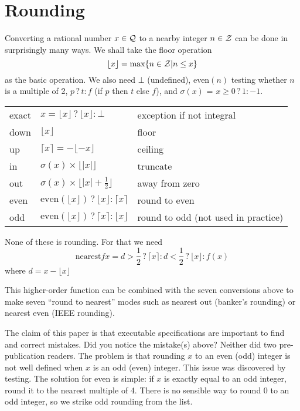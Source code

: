 \documentclass{article}
\begin{document}
\def\subI{${}_I$}
\def\subF{${}_F$}
\def\subD{${}_D$}
\def\ifso{\mathbin{?}}

\section{Rounding}

Converting a rational number $x \in {\cal Q}$ to a nearby
integer $n \in {\cal Z}$ can be done in surprisingly many
ways.  We shall take the floor operation
\[ \lfloor x \rfloor = \max \{n \in {\cal Z} | n \le x\} \]
as the basic operation.  We also need $\bot$ (undefined),
even$(n)$ testing whether $n$ is a multiple of 2,
$p \ifso t : f$ (if $p$ then $t$ else $f$), and $\sigma(x)$ =
$x\ge 0 \ifso 1 : -1$.

\begin{tabular}{lll}
exact & $x=\lfloor x\rfloor \ifso \lfloor x \rfloor : \bot$ &
        exception if not integral\\
down  & $\lfloor x \rfloor$             & floor\\
up    & $\lceil x \rceil = -\lfloor -x \rfloor$ & ceiling\\
in    & $\sigma(x)\times\lfloor|x|\rfloor$ & truncate\\
out   & $\sigma(x)\times\lfloor|x|+\frac12\rfloor$ & away from zero\\
even  & $\mbox{even}(\lfloor x\rfloor) \ifso \lfloor x \rfloor
        : \lceil x \rceil$ & round to even\\
odd   & $\mbox{even}(\lfloor x\rfloor) \ifso \lceil x \rceil
        : \lfloor x \rfloor$ & round to odd (not used in practice)
\end{tabular}

None of these is rounding.  For that we need
\[\mbox{nearest} f x = d > \frac12 \ifso \lceil x \rceil :
 d < \frac12 \ifso \lfloor x \rfloor : f(x) \]
\noindent where
$ d = x - \lfloor x \rfloor $

This higher-order function can be combined with the seven conversions
above to make seven ``round to nearest'' modes such as nearest out
(banker's rounding) or nearest even (IEEE rounding).

The claim of this paper is that executable specifications are important
to find and correct mistakes.  Did you notice the mistake(s) above?
Neither did two pre-publication readers.  The problem is that rounding
$x$ to an even (odd) integer is not well defined when $x$ is an odd (even)
integer.  This issue was discovered by testing.  The solution for even
is simple: if $x$ is exactly equal to an odd integer, round it to the
nearest multiple of 4.  There is no sensible way to round 0 to an odd
integer, so we strike odd rounding from the list.
\end{document}
